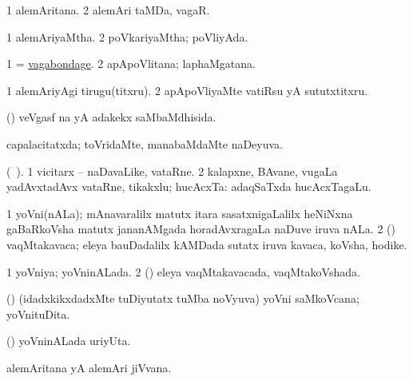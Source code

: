 \bentry
{} 
\gl{\nA}
\expl{}
\bmng
\bnum
\num{1} alemAritana. 
\num{2} alemAri taMDa, vagaR. 
\enum
\emng
\eentry

\bentry
{} 
\gl{\gu}
\expl{}
\bmng
\bnum
\num{1} alemAriyaMtha. 
\num{2} poVkariyaMtha; poVliyAda. 
\enum
\emng
\eentry

\bentry
{} 
\gl{\nA}
\expl{}
\bmng
\bnum
\num{1} = \hyperlink{vagabondage}{vagabondage}. 
\num{2} apApoVlitana; laphaMgatana. 
\enum
\emng
\eentry

\bentry
{} 
\gl{\akirx}
\expl{}
\bmng
\bnum
\num{1} alemAriyAgi tirugu(titxru). 
\num{2} apApoVliyaMte vatiRsu yA sututxtitxru. 
\enum
\emng
\eentry

\bentry
{} 
\gl{\gu}
\expl{}
\bmng
 (\aMrashA) veVgasf  na yA adakekx saMbaMdhisida. 
\emng
\eentry

\bentry
{} 
\gl{\gu}
\expl{}
\bmng
 capalacitatxda; toVridaMte, manabaMdaMte naDeyuva. 
\emng
\eentry

\bentry
{} 
\gl{\nA}(\bava\ ). 
\bmng
\bnum
\num{1} vicitarx -- naDavaLike, vataRne. 
\num{2} kalapxne, BAvane, \mo vugaLa yadAvxtadAvx vataRne, tikakxlu; hucAcxTa:  adaqSaTxda hucAcxTagaLu. 
\enum
\emng
\eentry

\bentry
{} 
\gl{\nA}
\bmng
\bnum
\num{1} yoVni(nALa); mAnavaralilx matutx itara sasatxnigaLalilx heNiNxna gaBaRkoVsha matutx jananAMgada horadAvxragaLa naDuve iruva nALa. 
\num{2} (\savi) vaqMtakavaca; eleya bauDadalilx kAMDada sutatx iruva kavaca, koVsha, hodike. 
\enum
\emng
\eentry

\bentry
{} 
\gl{\gu}
\expl{}
\bmng
\bnum
\num{1} yoVniya; yoVninALada. 
\num{2} (\savi) eleya vaqMtakavacada, vaqMtakoVshada. 
\enum
\emng
\eentry

\bentry
{} 
\gl{\nA}
\expl{}
\bmng
 (\veYshA) (idadxkikxdadxMte tuDiyutatx tuMba noVyuva) yoVni saMkoVcana; yoVnituDita. 
\emng
\eentry

\bentry
{} 
\gl{\nA}
\expl{}
\bmng
 (\veYshA) yoVninALada uriyUta. 
\emng
\eentry

\bentry
{} 
\gl{\nA}
\expl{}
\bmng
 alemAritana yA alemAri jiVvana. 
\emng
\eentry

